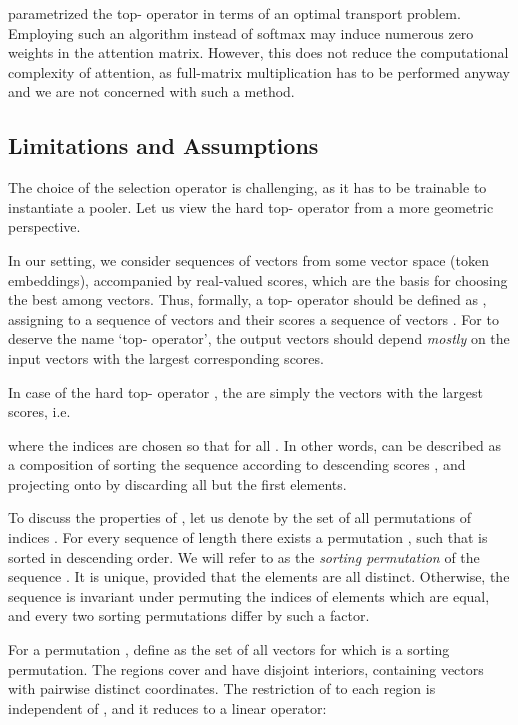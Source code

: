 \documentclass{article}
\begin{document}
\citet{xie2020differentiable} parametrized the top- operator in terms of an optimal transport problem.  Employing such an algorithm instead of softmax may induce numerous zero weights in the attention matrix. However, this does not reduce the computational complexity of attention, as full-matrix multiplication has to be performed anyway and we are not concerned with such a method.


\subsection{Limitations and Assumptions\label{sec:limitations}}

The choice of the selection operator is challenging, as it has to be trainable to instantiate a pooler. Let us view the hard top- operator from a more geometric perspective.


In our setting, we consider sequences of  vectors from some vector space  (token embeddings), accompanied by real-valued scores, which are the basis for choosing the best  among  vectors. Thus, formally, a top- operator should be defined as , assigning to a sequence of  vectors  and their scores  a sequence of  vectors . For  to deserve the name `top- operator', the output vectors  should depend \emph{mostly} on the  input vectors  with the largest corresponding scores.

In case of the hard top- operator , the  are simply the vectors  with the largest scores, i.e.

where the indices  are chosen so that  for all . In other words,  can be described as a composition of sorting the sequence  according to descending scores , and projecting onto  by discarding all but the first  elements.

To discuss the properties of , let us denote by  the set of all permutations of  indices . For every sequence  of length  there exists a permutation , such that  is sorted in descending order. We will refer to  as the \emph{sorting permutation} of the sequence . It is unique, provided that the elements  are all distinct. Otherwise, the sequence  is invariant under permuting the indices of elements which are equal, and every two sorting permutations differ by such a factor.

For a permutation , define  as the set of all vectors  for which  is a sorting permutation. The regions  cover  and have disjoint interiors, containing vectors with pairwise distinct coordinates. The restriction of  to each region  is independent of , and it reduces to a linear operator:
\end{document}
